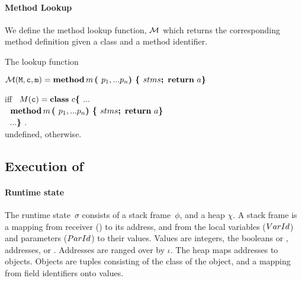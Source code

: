 \paragraph{Method Lookup} We define the method lookup function, $\cal M$ which returns the corresponding method definition given a class and a method identifier. 
\begin{definition}[Lookup] The lookup function

$
   {\cal M}({{\textrm{\ttfamily{M}}}{{{\textrm{\ttfamily{}}}}}},{\textrm{\ttfamily{\ensuremath{{\textrm{\ttfamily{c}}}{{\textrm{\ttfamily{}}}}}}}}, {\textrm{\ttfamily{m}}})      =       {\bf {method}}\, m\, \mbox{\tt{\bf{( }}} p_1, ... p_n \mbox{\tt{\bf{) }}}
\mbox{\tt{\bf{\{ }}} stms \mbox{{{\bf {;}}}\ }\, {\bf {return}}\ {a} \mbox{\tt{\bf{\} }}}  
 $

\noindent
 iff \ $ M({{\textrm{\ttfamily{c}}}{{\textrm{\ttfamily{}}}}}) =  {\bf {class}}\  {c}\mbox{\tt{\bf{\{ }}} ...  $\\
$ ~ $  \hspace{.7in} $ {\bf {method}}\, m\, \mbox{\tt{\bf{( }}} p_1, ... p_n \mbox{\tt{\bf{) }}}
\mbox{\tt{\bf{\{ }}} stms \mbox{{{\bf {;}}}\ }\, {\bf {return}}\ {a} \mbox{\tt{\bf{\} }}}$\\
$ ~ $ \hspace{.6in} $ ... \mbox{\tt{\bf{\} }}}.$
\\
\noindent
undefined, otherwise.
\end{definition}

 
  \subsection{Execution of  \LangOO}

 

  \paragraph{Runtime state}
\label{formal:state} The runtime state~$\sigma$ consists of a stack frame~$\phi$, and a heap $\chi$. A stack frame  is  a mapping from 
  receiver (\this) to its address, and from {the local variables (${VarId}$) and parameters (${ParId}$) to their values.}  Values are integers, 
 the booleans  or , addresses, or . Addresses are ranged over by $\iota$. The heap maps addresses to objects. Objects are tuples consisting of the class of the object, and a  mapping from field identifiers onto values.



